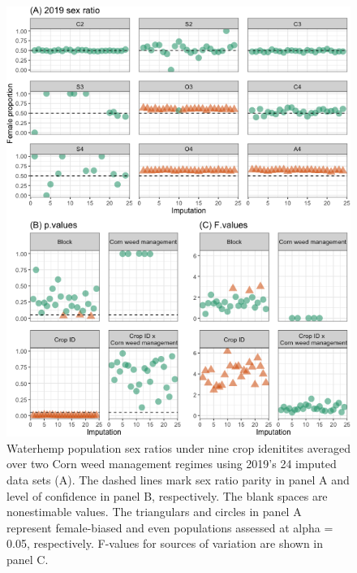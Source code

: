 \documentclass[
]{article}
\begin{document}
\begin{figure}
\centering
\includegraphics{Population-sex-biom-dens_files/figure-latex/sexr19-arrow-1.png}
\caption{\label{fig:sexr19-arrow}Waterhemp population sex ratios under nine crop idenitites averaged over two Corn weed management regimes using 2019's 24 imputed data sets (A). The dashed lines mark sex ratio parity in panel A and level of confidence in panel B, respectively. The blank spaces are nonestimable values. The triangulars and circles in panel A represent female-biased and even populations assessed at alpha = 0.05, respectively. F-values for sources of variation are shown in panel C.}
\end{figure}
\end{document}
